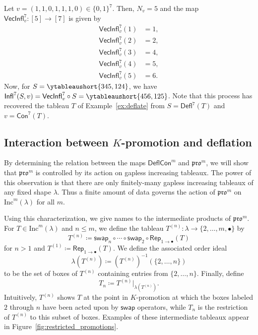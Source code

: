 \documentclass[12pt]{amsart}
\theoremstyle{definition}
\newenvironment{example}
  {\pushQED{\qed}\renewcommand{\qedsymbol}{$\diamondsuit$}\examplex}
  {\popQED\endexamplex}
\theoremstyle{remark}
\numberwithin{equation}{section}
\newcommand{\inc}{\ensuremath{\mathrm{Inc}}}
\newcommand{\pro}{\mathfrak{pro}}
\newcommand{\swap}{\ensuremath{\mathsf{swap}}}
\newcommand{\rep}{\ensuremath{\mathsf{Rep}}}
\newcommand{\deflate}{\ensuremath{\mathsf{Defl}}}
\newcommand{\inflate}{\ensuremath{\mathsf{VecInfl}}}
\newcommand{\tinflate}{\ensuremath{\mathsf{Infl}}}
\newcommand{\content}{\ensuremath{\mathsf{Con}}}
\newcommand{\compress}{\ensuremath{\mathsf{DeflCon}}}
\begin{document}
\begin{example}\label{ex:reinflate}
Let $v = (1,1,0,1,1,1,0) \in \{0,1\}^7$. Then, $N_v = 5$ and the map $\inflate^7_v : [5] \to [7]$ is given by 
\begin{align*}
\inflate^7_v(1) &= 1, \\
\inflate^7_v(2) &= 2, \\
\inflate_v^7(3) &= 4, \\
\inflate_v^7(4) &= 5, \\
\inflate_v^7(5) &= 6. 
\end{align*}
Now, for $S = \ytableaushort{345,124}$, we have $\tinflate^7(S,v) = \inflate^7_v \circ S = \ytableaushort{456,125}$. Note that this process has recovered the tableau $T$ of Example~\ref{ex:deflate} from $S=\deflate^7(T)$ and $v=\content^7(T)$.
\end{example}

\subsection{Interaction between $K$-promotion and deflation}
By determining the relation between the maps $\compress^m$ and $\pro^m$, we will show that $\pro^m$ is controlled by its action on gapless increasing tableaux. The power of this observation is that there are only finitely-many gapless increasing tableaux of any fixed shape $\lambda$. Thus a finite amount of data governs the action of $\pro^m$ on $\inc^m(\lambda)$ for all $m$.

Using this characterization, we give names to the intermediate products of $\pro^m$.
For $T \in \inc^m(\lambda)$ and $n \leq m$, we define the tableau $T^{(n)}: \lambda \rightarrow \lbrace 2, \dots, m, \bullet \rbrace$ by 
\[T^{(n)} \coloneqq \swap_n \circ \cdots \circ \swap_2 \circ \rep_{1 \rightarrow \bullet}(T)\] for $n > 1$ and $T^{(1)} \coloneqq \rep_{1 \rightarrow \bullet}(T)$. We define the associated order ideal 
\[
\lambda \left( T^{(n)} \right) \coloneqq \left( T^{(n)} \right)^{-1}(\{2,\dots,n\})
\]
 to be the set of boxes of $T^{(n)}$ containing entries from $\{2,\dots,n\}$. Finally, define 
 \[
 T_n \coloneqq T^{(n)} \vert_{\lambda \left( T^{(n)} \right) }.
 \]
  Intuitively, $T^{(n)}$ shows $T$ at the point in $K$-promotion at which the boxes labeled $2$ through $n$ have been acted upon by $\swap$ operators, while $T_n$ is the restriction of $T^{(n)}$ to this subset of boxes. Examples of these intermediate tableaux appear in Figure~\ref{fig:restricted_promotions}. 
  
\end{document}
